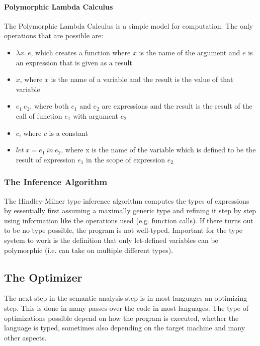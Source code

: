 \documentclass[12pt]{article}
\begin{document}
\paragraph{Polymorphic Lambda Calculus}
The Polymorphic Lambda Calculus is a simple model for computation.
The only operations that are possible are:
\begin{itemize}
	\item $\lambda x.\:e$,
	      which creates a function where $x$ is the name of the argument
	      and $e$ is an expression that is given as a result
	\item $x$, where $x$ is the name of a variable
	      and the result is the value of that variable
	\item $e_1\:e_2$, where both $e_1$ and $e_2$ are expressions and the result
	      is the result of the call of function $e_1$ with argument $e_2$\item $c$, where $c$ is a constant
	\item $let\:x = e_1\:in\:e_2$, where x is the name of the variable
	      which is defined to be the result of expression $e_1$ in the scope of expression $e_2$\end{itemize}

\subsubsection{The Inference Algorithm}
The Hindley-Milner type inference algorithm computes the types of expressions
by essentially first assuming a maximally generic type and refining it step by step
using information like the operations used (e.g. function calls).
If there turns out to be no type possible, the program is not well-typed.
Important for the type system to work is the definition that only let-defined variables
can be polymorphic (i.e. can take on multiple different types).

\subsection{The Optimizer}
The next step in the semantic analysis step is in most languages an optimizing step.
This is done in many passes over the code in most languages. The type of optimizations
possible depend on how the program is executed, whether the language is typed,
sometimes also depending on the target machine and many other aspects.
\end{document}
